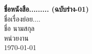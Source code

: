 \documentclass[11pt,a4paper]{book}
\begin{document}
\begin{titlepage}
    \centering
    \vspace*{3cm}
    {\Huge \textbf{ชื่อหนังสือ......... (ฉบับร่าง-01)}}\\
    \vspace{1cm}
    {\LARGE ชื่อเรื่องย่อย....}\\
    \vfill
    {\Large ชื่อ นามสกุล}\\
    {\large หน่วยงาน}\\
    \vspace{2cm}
    \large{\today}
\end{titlepage}

\frontmatter




\tableofcontents

\mainmatter



\backmatter

\clearpage
{} %
\printbibliography[title=บรรณานุกรม]


\clearpage
{} %
\printglossary[title=อภิธานศัพท์]

\clearpage
{} %
\printindex
\end{document}
